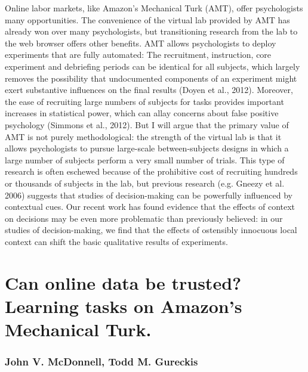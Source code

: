 \documentclass[10pt,letterpaper]{article}
\begin{document}
Online labor markets, like Amazon's Mechanical Turk (AMT), offer psychologists
many opportunities.  The convenience of the virtual lab provided by AMT has
already won over many psychologists, but transitioning research from the lab to
the web browser offers other benefits. AMT allows psychologists to deploy
experiments that are fully automated: The recruitment, instruction, core
experiment and debriefing periods can be identical for all subjects, which
largely removes the possibility that undocumented components of an experiment
might exert substantive influences on the final results (Doyen et al., 2012).
\nocite{Doyen} Moreover, the ease of recruiting large numbers of subjects for
tasks provides important increases in statistical power, which can allay concerns
about false positive psychology (Simmons et al., 2012).  \nocite{Simmons} But I
will argue that the primary value of AMT is not purely methodological: the
strength of the virtual lab is that it allows psychologists to pursue large-scale
between-subjects designs in which a large number of subjects perform a very small
number of trials.  This type of research is often eschewed because of the
prohibitive cost of recruiting hundreds or thousands of subjects in the lab, but
previous research (e.g. Gneezy et al. 2006) \nocite{Gneezy} suggests that studies
of decision-making can be powerfully influenced by contextual cues.  Our recent
work has found evidence that the effects of context on decisions may be even more
problematic than previously believed: in our studies of decision-making, we find
that the effects of ostensibly innocuous local context can shift the basic
qualitative results of experiments.

\section{Can online data be trusted? Learning tasks on Amazon's Mechanical Turk.}
\subsubsection{John V. McDonnell, Todd M. Gureckis}
\end{document}
